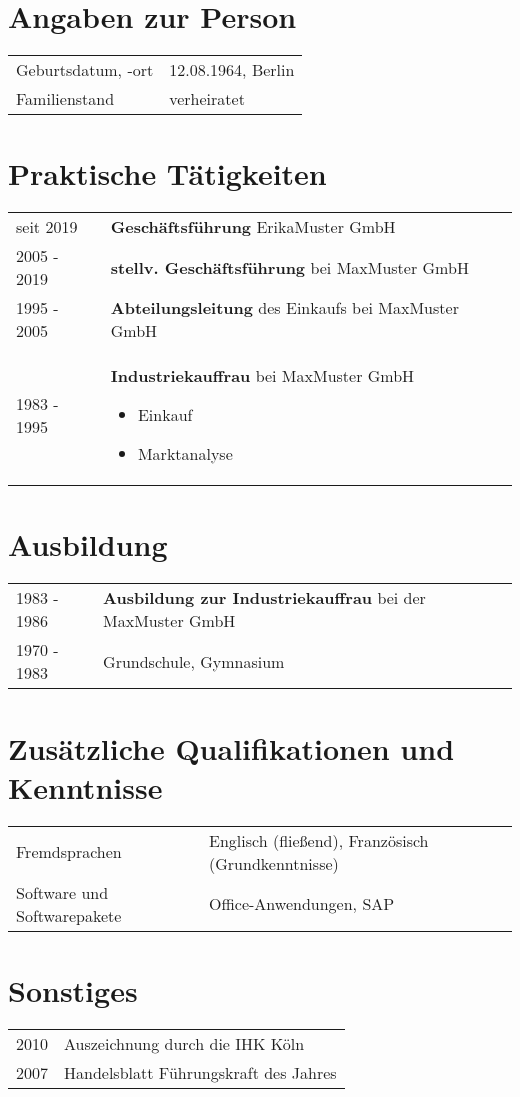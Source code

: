 \documentclass{simple_cv}
\newcommand\firstcol{3cm}
\newcommand\secondcol{13.5cm}
\begin{document}
\headerview
\vspace{1ex}

\section{Angaben zur Person}{
    \indent \footnotesize
    \begin{longtable}{p{\firstcol}p{\secondcol}}
        Geburtsdatum, -ort & 12.08.1964, Berlin\\
        Familienstand & verheiratet
    \end{longtable}
}

\section{Praktische Tätigkeiten}{
    \indent \footnotesize
    \begin{longtable}{p{\firstcol}p{\secondcol}}
        seit 2019 & \textbf{Geschäftsführung} ErikaMuster GmbH \\
        2005 - 2019 & \textbf{stellv. Geschäftsführung} bei MaxMuster GmbH \\
        1995 - 2005 & \textbf{Abteilungsleitung} des Einkaufs bei MaxMuster GmbH \\
        1983 - 1995 & \textbf{Industriekauffrau} bei MaxMuster GmbH
        \begin{itemize}
            \item Einkauf
            \item Marktanalyse
        \end{itemize}
    \end{longtable}
}

\section{Ausbildung}{
    \indent \footnotesize
    \begin{longtable}{p{\firstcol}p{\secondcol}}
        1983 - 1986 & \textbf{Ausbildung zur Industriekauffrau} bei der MaxMuster GmbH \\
        1970 - 1983 & Grundschule, Gymnasium
    \end{longtable}
}

\section{Zusätzliche Qualifikationen und Kenntnisse}{
    \indent \footnotesize
    \begin{longtable}{p{5cm}p{11.5cm}}
        Fremdsprachen & Englisch (fließend), Französisch (Grundkenntnisse) \\
        Software und Softwarepakete & Office-Anwendungen, SAP \\
    \end{longtable}
}

\section{Sonstiges}{
    \indent \footnotesize
    \begin{longtable}{p{\firstcol}p{\secondcol}}
        2010 & Auszeichnung durch die IHK Köln \\
        2007 & Handelsblatt Führungskraft des Jahres
    \end{longtable}
}

\end{document}
